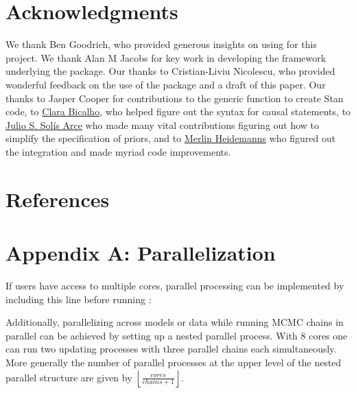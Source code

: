 \documentclass[
  11pt,
  article]{jss}
\renewcommand{\texttt}[1]{\code{#1}}
\begin{document}
\section*{Acknowledgments}\label{acknowledgments}

\begin{tcolorbox}[enhanced jigsaw, leftrule=.75mm, colframe=quarto-callout-color-frame, left=2mm, arc=.35mm, colback=white, toprule=.15mm, breakable, bottomrule=.15mm, rightrule=.15mm, opacityback=0]

We thank Ben Goodrich, who provided generous insights on using
\texttt{stan} for this project. We thank Alan M Jacobs for key work in
developing the framework underlying the package. Our thanks to
Cristian-Liviu Nicolescu, who provided wonderful feedback on the use of
the package and a draft of this paper. Our thanks to Jasper Cooper for
contributions to the generic function to create Stan code, to
\href{https://clarabicalho.github.io/}{Clara Bicalho}, who helped figure
out the syntax for causal statements, to
\href{https://www.gov.harvard.edu/directory/julio-s-solis-arce/}{Julio
S. Solís Arce} who made many vital contributions figuring out how to
simplify the specification of priors, and to
\href{https://merlinheidemanns.github.io/website/}{Merlin Heidemanns}
who figured out the \texttt{rstantools} integration and made myriad code
improvements.

\end{tcolorbox}

\section*{References}\label{references}

\renewcommand{\bibsection}{}


\newpage{}

\section*{Appendix A: Parallelization}\label{sec-parallel}

If users have access to multiple cores, parallel processing can be
implemented by including this line before running :

Additionally, parallelizing across models or data while running MCMC
chains in parallel can be achieved by setting up a nested parallel
process. With 8 cores one can run two updating processes with three
parallel chains each simultaneously. More generally the number of
parallel processes at the upper level of the nested parallel structure
are given by \(\left \lfloor \frac{cores}{chains + 1} \right \rfloor\).
\end{document}
